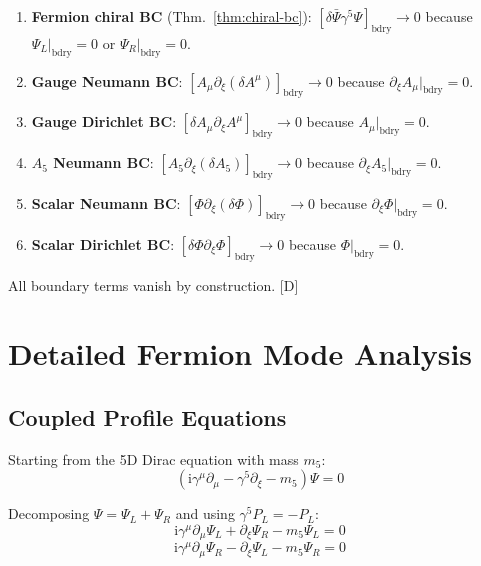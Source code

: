 \documentclass[11pt,a4paper]{article}
\newcommand{\ii}{\mathrm{i}}
\begin{document}
\begin{enumerate}
\item \textbf{Fermion chiral BC} (Thm.\ \ref{thm:chiral-bc}):
      $[\delta\bar{\Psi}\gamma^5\Psi]_{\text{bdry}} \to 0$ because $\Psi_L|_{\text{bdry}} = 0$ or $\Psi_R|_{\text{bdry}} = 0$.

\item \textbf{Gauge Neumann BC}:
      $[A_\mu \partial_\xi(\delta A^\mu)]_{\text{bdry}} \to 0$ because $\partial_\xi A_\mu|_{\text{bdry}} = 0$.

\item \textbf{Gauge Dirichlet BC}:
      $[\delta A_\mu \partial_\xi A^\mu]_{\text{bdry}} \to 0$ because $A_\mu|_{\text{bdry}} = 0$.

\item \textbf{$A_5$ Neumann BC}:
      $[A_5 \partial_\xi(\delta A_5)]_{\text{bdry}} \to 0$ because $\partial_\xi A_5|_{\text{bdry}} = 0$.

\item \textbf{Scalar Neumann BC}:
      $[\Phi \partial_\xi(\delta\Phi)]_{\text{bdry}} \to 0$ because $\partial_\xi\Phi|_{\text{bdry}} = 0$.

\item \textbf{Scalar Dirichlet BC}:
      $[\delta\Phi \partial_\xi\Phi]_{\text{bdry}} \to 0$ because $\Phi|_{\text{bdry}} = 0$.
\end{enumerate}

All boundary terms vanish by construction. [D]

\section{Detailed Fermion Mode Analysis}
\label{app:fermion-detail}

\subsection{Coupled Profile Equations}

Starting from the 5D Dirac equation with mass $m_5$:
\begin{equation}
(\ii\gamma^\mu\partial_\mu - \gamma^5\partial_\xi - m_5)\Psi = 0
\label{eq:5d-dirac-full}
\end{equation}

Decomposing $\Psi = \Psi_L + \Psi_R$ and using $\gamma^5 P_L = -P_L$:
\begin{equation}
\ii\gamma^\mu\partial_\mu\Psi_L + \partial_\xi\Psi_R - m_5\Psi_L = 0
\label{eq:dirac-L}
\end{equation}
\begin{equation}
\ii\gamma^\mu\partial_\mu\Psi_R - \partial_\xi\Psi_L - m_5\Psi_R = 0
\label{eq:dirac-R}
\end{equation}
\end{document}
